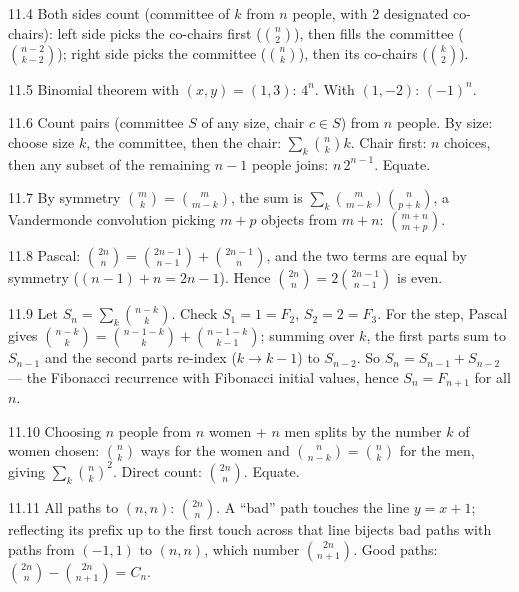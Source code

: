 \begin{solution}{11.4}
Both sides count (committee of $k$ from $n$ people, with $2$ designated
co-chairs): left side picks the co-chairs first
($\binom{n}{2}$), then fills the committee ($\binom{n-2}{k-2}$); right side
picks the committee ($\binom{n}{k}$), then its co-chairs ($\binom{k}{2}$).
\end{solution}

\begin{solution}{11.5}
Binomial theorem with $(x,y) = (1,3)$: $4^{n}$. With $(1,-2)$:
$(-1)^{n}$.
\end{solution}

\begin{solution}{11.6}
Count pairs (committee $S$ of any size, chair $c \in S$) from $n$ people.
By size: choose size $k$, the committee, then the chair:
$\sum_k \binom{n}{k} k$. Chair first: $n$ choices, then any subset of the
remaining $n-1$ people joins: $n \, 2^{n-1}$. Equate.
\end{solution}

\begin{solution}{11.7}
By symmetry $\binom{m}{k} = \binom{m}{m-k}$, the sum is
$\sum_{k} \binom{m}{m-k}\binom{n}{p+k}$, a Vandermonde convolution picking
$m + p$ objects from $m + n$:
$\binom{m+n}{m+p}$.
\end{solution}

\begin{solution}{11.8}
Pascal: $\binom{2n}{n} = \binom{2n-1}{n-1} + \binom{2n-1}{n}$, and the two
terms are equal by symmetry ($(n-1) + n = 2n - 1$). Hence
$\binom{2n}{n} = 2\binom{2n-1}{n-1}$ is even.
\end{solution}

\begin{solution}{11.9}
Let $S_n = \sum_k \binom{n-k}{k}$. Check $S_1 = 1 = F_2$, $S_2 = 2 = F_3$.
For the step, Pascal gives
$\binom{n-k}{k} = \binom{n-1-k}{k} + \binom{n-1-k}{k-1}$;
summing over $k$, the first parts sum to $S_{n-1}$ and the second parts
re-index ($k \to k-1$) to $S_{n-2}$. So $S_n = S_{n-1} + S_{n-2}$ ---
the Fibonacci recurrence with Fibonacci initial values, hence
$S_n = F_{n+1}$ for all $n$.
\end{solution}

\begin{solution}{11.10}
Choosing $n$ people from $n$ women + $n$ men splits by the number $k$ of
women chosen: $\binom{n}{k}$ ways for the women and
$\binom{n}{n-k} = \binom{n}{k}$ for the men, giving
$\sum_k \binom{n}{k}^2$. Direct count: $\binom{2n}{n}$. Equate.
\end{solution}

\begin{solution}{11.11}
All paths to $(n,n)$: $\binom{2n}{n}$. A ``bad'' path touches the line
$y = x + 1$; reflecting its prefix up to the first touch across that line
bijects bad paths with paths from $(-1, 1)$ to $(n,n)$, which number
$\binom{2n}{n+1}$. Good paths: $\binom{2n}{n} - \binom{2n}{n+1} = C_n$.
\end{solution}
